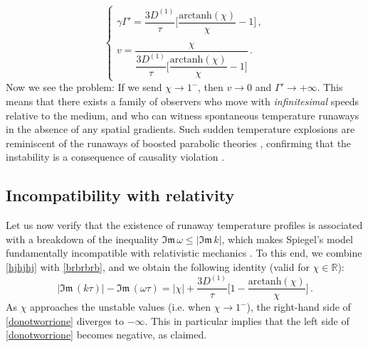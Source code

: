 \documentclass[a4paper, amsfonts, amssymb, amsmath, reprint, showkeys, nofootinbib, twoside,notitlepage,onecolumn]{revtex4-2}
\theoremstyle{definition}
\theoremstyle{theorem}
\theoremstyle{corollary}
\begin{document}
\vspace{-0.1cm}
\begin{equation}\label{brbrbrb}
\begin{cases}
\gamma\Gamma' = \dfrac{3D^{(1)}}{\tau} \bigg[\dfrac{\text{arctanh}(\chi)}{\chi} -1\bigg]\, , \\
\\
v=\dfrac{\chi}{\dfrac{3D^{(1)}}{\tau} \bigg[\dfrac{\text{arctanh}(\chi)}{\chi} -1\bigg]} \, .
\end{cases}
\end{equation}
Now we see the problem: If we send $\chi\rightarrow 1^-$, then $v\rightarrow 0$ and $\Gamma'\rightarrow +\infty$. This means that there exists a family of observers who move with \textit{infinitesimal} speeds relative to the medium, and who can witness spontaneous temperature runaways in the absence of any spatial gradients. Such sudden temperature explosions are reminiscent of the runaways of boosted parabolic theories \cite{Hiscock_Insatibility_first_order,Kost2000,GavassinoLyapunov_2020}, confirming that the instability is a consequence of causality violation \cite{GavassinoSuperluminal2021,GavassinoBounds2023}. 



\subsection{Incompatibility with relativity}\label{AAA}

Let us now verify that the existence of runaway temperature profiles is associated with a breakdown of the inequality $\mathfrak{Im}\, \omega \leq |\mathfrak{Im}\, k|$, which makes Spiegel's model fundamentally incompatible with relativistic mechanics \cite{HellerBounds2023,HellerHydroHedron2023jtd,GavassinoBounds2023,GavassinoDispersion2024}. To this end, we combine \eqref{hjhjhj} with \eqref{brbrbrb}, and we obtain the following identity (valid for $\chi \in \mathbb{R}$):
\begin{equation}\label{donotworrione}
|\mathfrak{Im}\, (k\tau)|-\mathfrak{Im}\, (\omega\tau)= |\chi|+\dfrac{3D^{(1)}}{\tau} \bigg[1-\dfrac{\text{arctanh}(\chi)}{\chi} \bigg] \, .
\end{equation}
As $\chi$ approaches the unstable values (i.e. when $\chi\rightarrow 1^-$), the right-hand side of \eqref{donotworrione} diverges to $-\infty$. This in particular implies that the left side of \eqref{donotworrione} becomes negative, as claimed.
\end{document}
